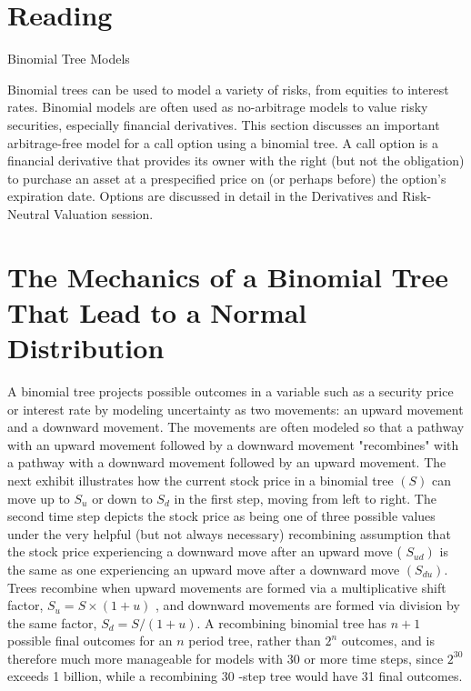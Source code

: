 \documentclass[11pt]{article}
\begin{document}
\section*{Reading}
Binomial Tree Models

Binomial trees can be used to model a variety of risks, from equities to interest rates. Binomial models are often used as no-arbitrage models to value risky securities, especially financial derivatives. This section discusses an important arbitrage-free model for a call option using a binomial tree. A call option is a financial derivative that provides its owner with the right (but not the obligation) to purchase an asset at a prespecified price on (or perhaps before) the option's expiration date. Options are discussed in detail in the Derivatives and Risk-Neutral Valuation session.

\section*{The Mechanics of a Binomial Tree That Lead to a Normal Distribution}
A binomial tree projects possible outcomes in a variable such as a security price or interest rate by modeling uncertainty as two movements: an upward movement and a downward movement. The movements are often modeled so that a pathway with an upward movement followed by a downward movement "recombines" with a pathway with a downward movement followed by an upward movement. The next exhibit illustrates how the current stock price in a binomial tree $(S)$ can move up to $S_{u}$ or down to $S_{d}$ in the first step, moving from left to right. The second time step depicts the stock price as being one of three possible values under the very helpful (but not always necessary) recombining assumption that the stock price experiencing a downward move after an upward move ( $\left.S_{u d}\right)$ is the same as one experiencing an upward move after a downward move $\left(S_{d u}\right)$. Trees recombine when upward movements are formed via a multiplicative shift factor, $S_{u}=S \times(1+u)$ , and downward movements are formed via division by the same factor, $S_{d}=S /(1+u)$. A recombining binomial tree has $n+1$ possible final outcomes for an $n$ period tree, rather than $2^{n}$ outcomes, and is therefore much more manageable for models with 30 or more time steps, since $2^{30}$ exceeds 1 billion, while a recombining 30 -step tree would have 31 final outcomes.
\end{document}

